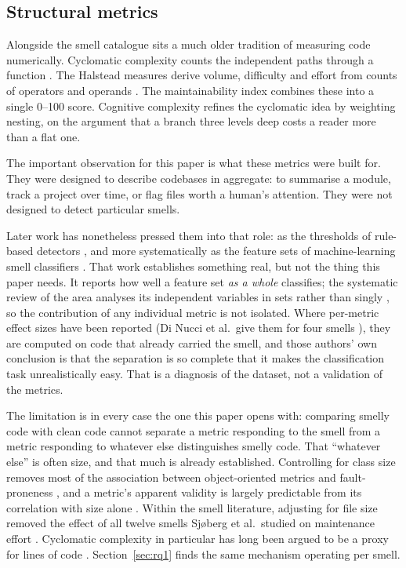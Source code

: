 \documentclass[10pt,a4paper,twocolumn]{article}
\begin{document}
\subsection{Structural metrics}

Alongside the smell catalogue sits a much older tradition of measuring code
numerically. Cyclomatic complexity counts the independent paths through a
function \cite{mccabe1976complexity}. The Halstead measures derive volume,
difficulty and effort from counts of operators and operands
\cite{halstead1977elements}. The maintainability index combines these into a
single 0--100 score. Cognitive complexity refines the cyclomatic idea by
weighting nesting, on the argument that a branch three levels deep costs a reader
more than a flat one.

The important observation for this paper is what these metrics were built for. They were designed to describe codebases in aggregate: to summarise
a module, track a project over time, or flag files worth a human's attention.
They were not designed to detect particular smells.

Later work has nonetheless pressed them into that role: as the thresholds of
rule-based detectors \cite{moha2010decor}, and more systematically as the
feature sets of machine-learning smell classifiers
\cite{fontana2016comparing,azeem2019machine}. That work establishes something
real, but not the thing this paper needs. It reports how well a feature set
\emph{as a whole} classifies; the systematic review of the area analyses its
independent variables in sets rather than singly \cite{azeem2019machine}, so the
contribution of any individual metric is not isolated. Where per-metric effect
sizes have been reported (Di Nucci et al.\ give them for four smells
\cite{dinucci2018detecting}), they are computed on code that already carried the
smell, and those authors' own conclusion is that the separation is so complete
that it makes the classification task unrealistically easy. That is a diagnosis
of the dataset, not a validation of the metrics.

The limitation is in every case the one this paper opens with: comparing smelly
code with clean code cannot separate a metric responding to the smell from a
metric responding to whatever else distinguishes smelly code. That ``whatever
else'' is often size, and that much is already established.
Controlling for class size removes most of the association between
object-oriented metrics and fault-proneness \cite{elemam2001confounding}, and a
metric's apparent validity is largely predictable from its correlation with size
alone \cite{gil2017correlation}. Within the smell literature, adjusting for file
size removed the effect of all twelve smells Sj\o{}berg et al.\ studied on
maintenance effort \cite{sjoberg2013quantifying}. Cyclomatic complexity in
particular has long been argued to be a proxy for lines of code
\cite{shepperd1988critique,jay2009cyclomatic}. Section~\ref{sec:rq1} finds the
same mechanism operating per smell.
\end{document}
